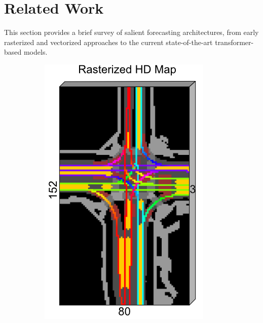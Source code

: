 \section{Related Work}
\label{sec:review}

This section provides a brief survey of salient forecasting architectures, from early rasterized and vectorized approaches to the current state-of-the-art transformer-based models.

\begin{figure}[H]
\centering
\begin{subfigure}[t]{0.35\textwidth}
    \centering
    \includegraphics[width=\textwidth]{figures/caspnet-bev-repr.png}
    \label{fig:rasterized}

\end{subfigure}
\end{figure}
